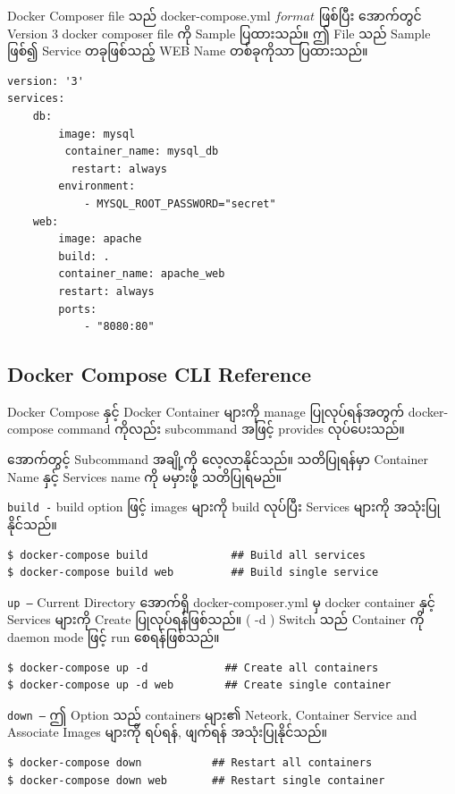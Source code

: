 Docker Composer file သည် docker-compose.yml $format$ ဖြစ်ပြီး အောက်တွင်
Version 3 docker composer file ကို Sample ပြထားသည်။ ဤ File သည် Sample
ဖြစ်၍ Service တခုဖြစ်သည့် WEB Name တစ်ခုကိုသာ ပြထားသည်။

\begin{verbatim}
version: '3'
services:
    db:
        image: mysql
         container_name: mysql_db
          restart: always
        environment:
            - MYSQL_ROOT_PASSWORD="secret"
    web:
        image: apache
        build: .
        container_name: apache_web
        restart: always
        ports:
            - "8080:80"
\end{verbatim}

\subsection{Docker Compose CLI
Reference}\label{docker-compose-cli-reference}

Docker Compose နှင့် Docker Container များကို manage ပြုလုပ်ရန်အတွက်
docker-compose command ကိုလည်း subcommand အဖြင့် provides လုပ်ပေးသည်။

အောက်တွင့် Subcommand အချို့ကို လေ့လာနိုင်သည်။ သတိပြုရန်မှာ Container
Name နှင့် Services name ကို မမှားဖို့ သတိပြုရမည်။

\texttt{build -} build option ဖြင့် images များကို build လုပ်ပြီး
Services များကို အသုံးပြုနိုင်သည်။

\begin{verbatim}
$ docker-compose build             ## Build all services
$ docker-compose build web         ## Build single service
\end{verbatim}

\texttt{up –} Current Directory အောက်ရှိ docker-composer.yml မှ docker
container နှင့် Services များကို Create ပြုလုပ်ရန်ဖြစ်သည်။ ( -d ) Switch
သည် Container ကို daemon mode ဖြင့် run စေရန်ဖြစ်သည်။

\begin{verbatim}
$ docker-compose up -d            ## Create all containers
$ docker-compose up -d web        ## Create single container
\end{verbatim}

\texttt{down –} ဤ Option သည် containers များ၏ Neteork, Container Service
and Associate Images များကို ရပ်ရန်, ဖျက်ရန် အသုံးပြုနိုင်သည်။

\begin{verbatim}
$ docker-compose down           ## Restart all containers
$ docker-compose down web       ## Restart single container
\end{verbatim}

